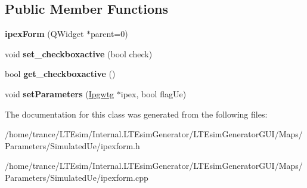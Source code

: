 \subsection*{Public Member Functions}
\begin{DoxyCompactItemize}
\item 
{\bfseries ipex\+Form} (Q\+Widget $\ast$parent=0)\hypertarget{classipex_form_a74d570ebd91e0215f3ca0abf4db58c79}{}\label{classipex_form_a74d570ebd91e0215f3ca0abf4db58c79}

\item 
void {\bfseries set\+\_\+checkboxactive} (bool check)\hypertarget{classipex_form_a574dabff8ac846ba7e6551795b6ee5ef}{}\label{classipex_form_a574dabff8ac846ba7e6551795b6ee5ef}

\item 
bool {\bfseries get\+\_\+checkboxactive} ()\hypertarget{classipex_form_aacc1ae0386bf54465506f575f804e1ca}{}\label{classipex_form_aacc1ae0386bf54465506f575f804e1ca}

\item 
void {\bfseries set\+Parameters} (\hyperlink{class_ipgwtg}{Ipgwtg} $\ast$ipex, bool flag\+Ue)\hypertarget{classipex_form_abe10f0dd8d705a043eb1b553309b85e9}{}\label{classipex_form_abe10f0dd8d705a043eb1b553309b85e9}

\end{DoxyCompactItemize}


The documentation for this class was generated from the following files\+:\begin{DoxyCompactItemize}
\item 
/home/trance/\+L\+T\+Esim/\+Internal.\+L\+T\+Esim\+Generator/\+L\+T\+Esim\+Generator\+G\+U\+I/\+Maps/\+Parameters/\+Simulated\+Ue/ipexform.\+h\item 
/home/trance/\+L\+T\+Esim/\+Internal.\+L\+T\+Esim\+Generator/\+L\+T\+Esim\+Generator\+G\+U\+I/\+Maps/\+Parameters/\+Simulated\+Ue/ipexform.\+cpp\end{DoxyCompactItemize}
